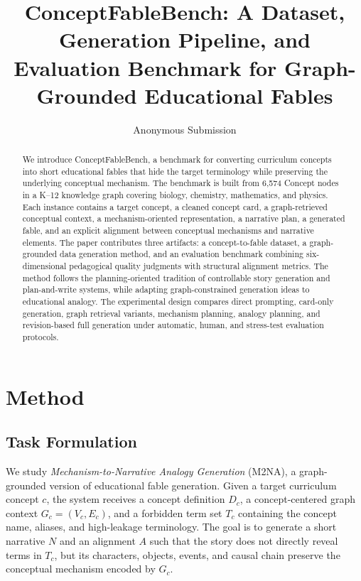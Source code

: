 \documentclass[letterpaper]{article} %
\title{ConceptFableBench: A Dataset, Generation Pipeline, and Evaluation Benchmark for Graph-Grounded Educational Fables}
\author{
    Anonymous Submission
}
\begin{document}
\maketitle

\begin{abstract}
We introduce ConceptFableBench, a benchmark for converting curriculum concepts into short educational fables that hide the target terminology while preserving the underlying conceptual mechanism. The benchmark is built from 6,574 Concept nodes in a K--12 knowledge graph covering biology, chemistry, mathematics, and physics. Each instance contains a target concept, a cleaned concept card, a graph-retrieved conceptual context, a mechanism-oriented representation, a narrative plan, a generated fable, and an explicit alignment between conceptual mechanisms and narrative elements. The paper contributes three artifacts: a concept-to-fable dataset, a graph-grounded data generation method, and an evaluation benchmark combining six-dimensional pedagogical quality judgments with structural alignment metrics. The method follows the planning-oriented tradition of controllable story generation and plan-and-write systems, while adapting graph-constrained generation ideas to educational analogy. The experimental design compares direct prompting, card-only generation, graph retrieval variants, mechanism planning, analogy planning, and revision-based full generation under automatic, human, and stress-test evaluation protocols.
\end{abstract}

\section{Method}

\subsection{Task Formulation}

We study \emph{Mechanism-to-Narrative Analogy Generation} (M2NA), a graph-grounded version of educational fable generation. Given a target curriculum concept $c$, the system receives a concept definition $D_c$, a concept-centered graph context $G_c=(V_c,E_c)$, and a forbidden term set $T_c$ containing the concept name, aliases, and high-leakage terminology. The goal is to generate a short narrative $N$ and an alignment $A$ such that the story does not directly reveal terms in $T_c$, but its characters, objects, events, and causal chain preserve the conceptual mechanism encoded by $G_c$.
\end{document}
